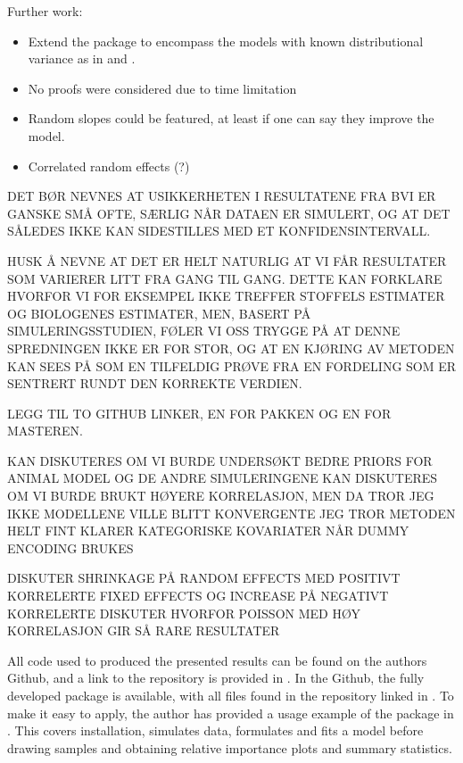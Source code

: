 Further work:
\begin{itemize}
    \item Extend the package to encompass the models with known distributional variance as in \citet{nakagawa2013general} and \citet{nakagawa2017}.
    \item No proofs were considered due to time limitation
    \item Random slopes could be featured, at least if one can say they improve the model.
    \item Correlated random effects (?)
\end{itemize}

DET BØR NEVNES AT USIKKERHETEN I RESULTATENE FRA BVI ER GANSKE SMÅ OFTE, SÆRLIG NÅR DATAEN ER SIMULERT, OG AT DET SÅLEDES IKKE KAN SIDESTILLES MED ET KONFIDENSINTERVALL.


HUSK Å NEVNE AT DET ER HELT NATURLIG AT VI FÅR RESULTATER SOM VARIERER LITT FRA GANG TIL GANG. DETTE KAN FORKLARE HVORFOR VI FOR EKSEMPEL IKKE TREFFER STOFFELS ESTIMATER OG BIOLOGENES ESTIMATER, MEN, BASERT PÅ SIMULERINGSSTUDIEN, FØLER VI OSS TRYGGE PÅ AT DENNE SPREDNINGEN IKKE ER FOR STOR, OG AT EN KJØRING AV METODEN KAN SEES PÅ SOM EN TILFELDIG PRØVE FRA EN FORDELING SOM ER SENTRERT RUNDT DEN KORREKTE VERDIEN.

LEGG TIL TO GITHUB LINKER, EN FOR PAKKEN OG EN FOR MASTEREN.

KAN DISKUTERES OM VI BURDE UNDERSØKT BEDRE PRIORS FOR ANIMAL MODEL OG DE ANDRE SIMULERINGENE
KAN DISKUTERES OM VI BURDE BRUKT HØYERE KORRELASJON, MEN DA TROR JEG IKKE MODELLENE VILLE BLITT KONVERGENTE
JEG TROR METODEN HELT FINT KLARER KATEGORISKE KOVARIATER NÅR DUMMY ENCODING BRUKES

DISKUTER SHRINKAGE PÅ RANDOM EFFECTS MED POSITIVT KORRELERTE FIXED EFFECTS OG INCREASE PÅ NEGATIVT KORRELERTE
DISKUTER HVORFOR POISSON MED HØY KORRELASJON GIR SÅ RARE RESULTATER

All code used to produced the presented results can be found on the authors Github, and a link to the repository is provided in . In the Github, the fully developed package is available, with all files found in the repository linked in . To make it easy to apply, the author has provided a usage example of the package in . This covers installation, simulates data, formulates and fits a model before drawing samples and obtaining relative importance plots and summary statistics. 

